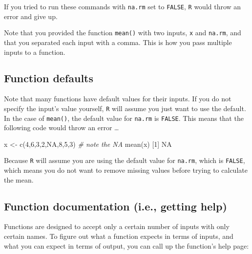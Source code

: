 \documentclass[
]{book}
\newenvironment{Shaded}{\begin{snugshade}}{\end{snugshade}}
\newcommand{\CommentTok}[1]{\textcolor[rgb]{0.56,0.35,0.01}{\textit{#1}}}
\newcommand{\ConstantTok}[1]{\textcolor[rgb]{0.00,0.00,0.00}{#1}}
\newcommand{\DecValTok}[1]{\textcolor[rgb]{0.00,0.00,0.81}{#1}}
\newcommand{\FunctionTok}[1]{\textcolor[rgb]{0.00,0.00,0.00}{#1}}
\newcommand{\NormalTok}[1]{#1}
\newcommand{\OtherTok}[1]{\textcolor[rgb]{0.56,0.35,0.01}{#1}}
\begin{document}
If you tried to run these commands with \texttt{na.rm} set to \texttt{FALSE}, \texttt{R} would throw an error and give up.

Note that you provided the function \texttt{mean()} with two inputs, \texttt{x} and \texttt{na.rm}, and that you separated each input with a comma. This is how you pass multiple inputs to a function.

\hypertarget{function-defaults}{%
\subsection*{Function defaults}\label{function-defaults}}

Note that many functions have default values for their inputs. If you do not specify the input's value yourself, \texttt{R} will assume you just want to use the default. In the case of \texttt{mean()}, the default value for \texttt{na.rm} is \texttt{FALSE}. This means that the following code would throw an error \ldots{}

\begin{Shaded}
\begin{Highlighting}[]
\NormalTok{x }\OtherTok{\textless{}{-}} \FunctionTok{c}\NormalTok{(}\DecValTok{4}\NormalTok{,}\DecValTok{6}\NormalTok{,}\DecValTok{3}\NormalTok{,}\DecValTok{2}\NormalTok{,}\ConstantTok{NA}\NormalTok{,}\DecValTok{8}\NormalTok{,}\DecValTok{5}\NormalTok{,}\DecValTok{3}\NormalTok{)  }\CommentTok{\# note the NA}
\FunctionTok{mean}\NormalTok{(x)}
\NormalTok{[}\DecValTok{1}\NormalTok{] }\ConstantTok{NA}
\end{Highlighting}
\end{Shaded}

Because \texttt{R} will assume you are using the default value for \texttt{na.rm}, which is \texttt{FALSE}, which means you do not want to remove missing values before trying to calculate the mean.

\hypertarget{function-documentation-i.e.-getting-help}{%
\subsection*{Function documentation (i.e., getting help)}\label{function-documentation-i.e.-getting-help}}

Functions are designed to accept only a certain number of inputs with only certain names. To figure out what a function expects in terms of inputs, and what you can expect in terms of output, you can call up the function's help page:
\end{document}
